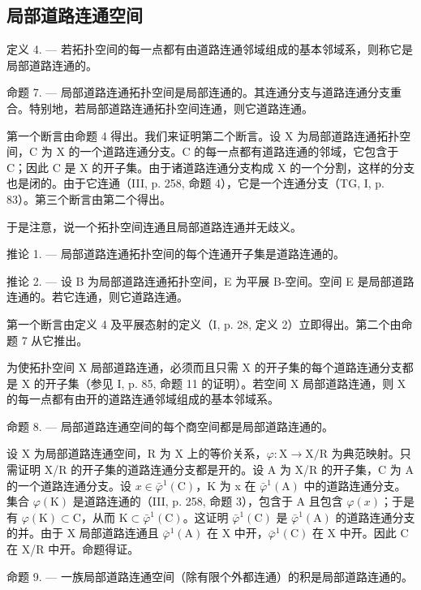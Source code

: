 \subsection{局部道路连通空间}

定义 4. --- 若拓扑空间的每一点都有由道路连通邻域组成的基本邻域系，则称它是局部道路连通的。

命题 7. --- 局部道路连通拓扑空间是局部连通的。其连通分支与道路连通分支重合。特别地，若局部道路连通拓扑空间连通，则它道路连通。

第一个断言由命题 4 得出。我们来证明第二个断言。设 X 为局部道路连通拓扑空间，C 为 X 的一个道路连通分支。C 的每一点都有道路连通的邻域，它包含于 C；因此 C 是 X 的开子集。由于诸道路连通分支构成 X 的一个分割，这样的分支也是闭的。由于它连通（III, p. 258, 命题 4），它是一个连通分支（TG, I, p. 83）。第三个断言由第二个得出。

于是注意，说一个拓扑空间连通且局部道路连通并无歧义。

推论 1. --- 局部道路连通拓扑空间的每个连通开子集是道路连通的。

推论 2. --- 设 B 为局部道路连通拓扑空间，E 为平展 B-空间。空间 E 是局部道路连通的。若它连通，则它道路连通。

第一个断言由定义 4 及平展态射的定义（I, p. 28, 定义 2）立即得出。第二个由命题 7 从它推出。

为使拓扑空间 X 局部道路连通，必须而且只需 X 的开子集的每个道路连通分支都是 X 的开子集（参见 I, p. 85, 命题 11 的证明）。若空间 X 局部道路连通，则 X 的每一点都有由开的道路连通邻域组成的基本邻域系。

命题 8. --- 局部道路连通空间的每个商空间都是局部道路连通的。

设 X 为局部道路连通空间，R 为 X 上的等价关系，\(\varphi\colon\mathrm{X}\to\mathrm{X}/\mathrm{R}\) 为典范映射。只需证明 X/R 的开子集的道路连通分支都是开的。设 A 为 X/R 的开子集，C 为 A 的一个道路连通分支。设 \(x\in\bar{\varphi}^{1}(\mathrm{C})\)，K 为 x 在 \(\bar{\varphi}^{1}(\mathrm{A})\) 中的道路连通分支。集合 \(\varphi(\mathrm{K})\) 是道路连通的（III, p. 258, 命题 3），包含于 A 且包含 \(\varphi(x)\)；于是有 \(\varphi(\mathrm{K})\subset\mathrm{C}\)，从而 \(\mathrm{K}\subset\bar{\varphi}^{1}(\mathrm{C})\)。这证明 \(\bar{\varphi}^{1}(\mathrm{C})\) 是 \(\bar{\varphi}^{1}(\mathrm{A})\) 的道路连通分支的并。由于 X 局部道路连通且 \(\bar{\varphi}^{1}(\mathrm{A})\) 在 X 中开，\(\bar{\varphi}^{1}(\mathrm{C})\) 在 X 中开。因此 C 在 X/R 中开。命题得证。

命题 9. --- 一族局部道路连通空间（除有限个外都连通）的积是局部道路连通的。

